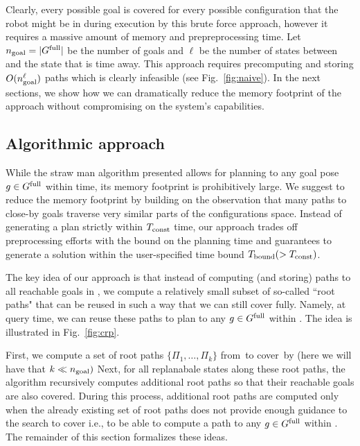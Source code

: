 \documentclass[a4paper]{report}
\begin{document}
Clearly, every possible goal is covered for every possible configuration that the robot might be in during execution by this brute force approach, however it requires a massive amount of memory and prepreprocessing time.
Let $n_{\rm goal} = \vert G^{\textrm{full}} \vert$ be the number of goals and
$\ell$ be the number of states between \Shome and the state that is \Trc time away.
This approach requires precomputing and storing $O(n_{\rm goal}^\ell)$ paths which is clearly infeasible (see Fig.~\ref{fig:naive}).
In the next sections, we show how we can dramatically reduce the memory footprint of the approach without compromising on the system's capabilities.




\subsection{Algorithmic approach}
While the straw man algorithm presented  allows for planning to any goal pose $ g \in G^{\textrm{full}}$ within \Tconst time, its memory footprint is prohibitively large.
%
We suggest to reduce the memory footprint by building on the observation that many paths to close-by goals traverse very similar parts of the configurations space. Instead of generating a plan strictly within $T_{\textrm{const}}$ time, our approach trades off preprocessing efforts with the bound on the planning time and guarantees to generate a solution within the user-specified time bound $T_{\textrm{bound}} (> T_{\textrm{const}})$.


The key idea of our approach is that instead of computing (and storing) paths to all reachable goals in \Gfull, we compute a relatively small subset of so-called ``root paths" that can be reused in such a way that we can still cover \Gfull fully. Namely, at query time, we can reuse these paths to plan to any $g\in G^{\textrm{full}}$ within \Tbound. The idea is illustrated in Fig.~\ref{fig:crp}.


First, we compute a set of root paths $\{\Pi_1, \ldots, \Pi_k \}$ from~\Shome to cover~\Gfull by \Shome (here we will have that $k \ll n_{\rm goal})$ 
%
Next, for all replanabale states along these root paths, the algorithm recursively computes additional root paths so that their reachable goals are also covered.
During this process, additional root paths are computed only when the already existing set of root paths does not provide enough guidance to the search to cover \Gfull i.e., to be able to compute a path to any $g \in G^{\textrm{full}}$ within \Tbound.
%
%
The remainder of this section formalizes these ideas.
\end{document}
